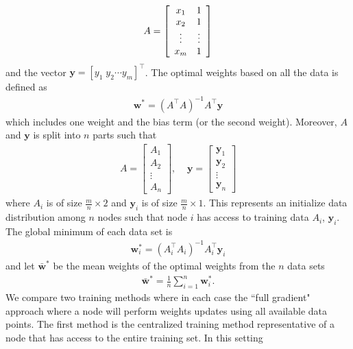 \documentclass[11pt, fullpage,letterpaper]{article}
\begin{document}
\begin{enumerate}
\begin{align}
A = \left[ \begin{array}{c c}
           x_1 & 1   \\
           x_2 & 1   \\
           \vdots & \vdots   \\
           x_m & 1
         \end{array} \right]
\end{align}
and the vector $\boldsymbol{y}= [y_1 \; y_2 \cdots y_m]^\intercal$. The optimal weights based on all the data is defined as
\begin{align}
\boldsymbol{w}^* = (A^\intercal A)^{-1} A^\intercal \boldsymbol{y}
\end{align}
which includes one weight and the bias term (or the second weight). Moreover, $A$ and $\boldsymbol{y}$ is split into $n$ parts such that
\begin{align}
A = \left[ \begin{array}{c }
           A_1   \\
           A_2    \\
           \vdots  \\
           A_n
         \end{array} \right], \;\;\;\; \boldsymbol{y} = \left[ \begin{array}{c }
           \boldsymbol{y}_1   \\
           \boldsymbol{y}_2    \\
           \vdots  \\
           \boldsymbol{y}_n
         \end{array} \right]
\end{align}
where $A_i$ is of size $\frac{m}{n}\times 2$ and $\boldsymbol{y}_i$ is of size $\frac{m}{n}\times 1$. This represents an initialize data distribution among $n$ nodes such that node $i$ has access to training data $A_i$, $\boldsymbol{y}_i$. The global minimum of each data set is
\begin{align}
\boldsymbol{w}^*_i = (A_i^\intercal A_i)^{-1} A_i^\intercal \boldsymbol{y}_i
\end{align}
and let $\bar{\boldsymbol{w}}^*$ be the mean weights of the optimal weights from the $n$ data sets
\begin{align}
\bar{\boldsymbol{w}}^* = \frac{1}{n}\sum_{i=1}^{n}\boldsymbol{w}_i^*.
\end{align}
We compare two training methods where in each case the ``full gradient" approach where a node will perform weights updates using all available data points. The first method is the centralized training method representative of a node that has access to the entire training set. In this setting

\end{enumerate}
\end{document}
